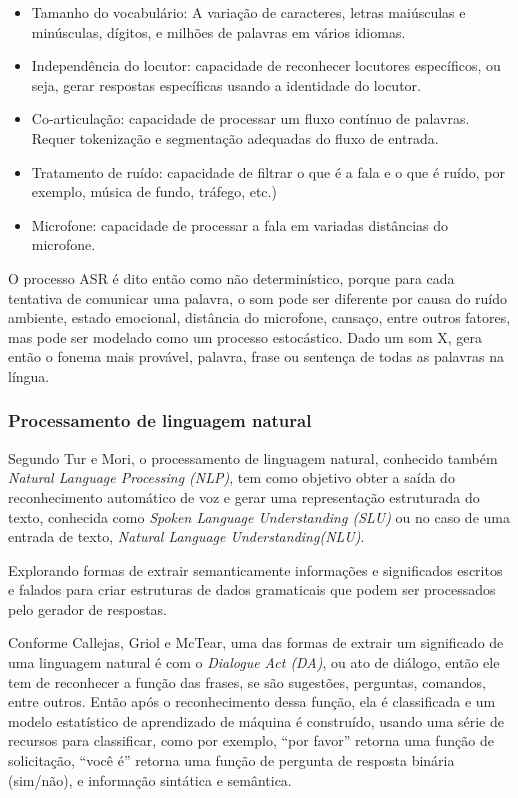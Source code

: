 \documentclass[
	12pt,				%
	oneside,
	a4paper,			%
	english,			%
	french,				%
	spanish,			%
	brazil				%
	]{abntex2}
\begin{document}
\begin{itemize}
	\item Tamanho do vocabulário: A variação de caracteres, letras maiúsculas e minúsculas, dígitos, e milhões de palavras em vários idiomas.
	\item Independência do locutor: capacidade de reconhecer locutores específicos, ou seja, gerar respostas específicas usando a identidade do locutor.
	\item Co-articulação: capacidade de processar um fluxo contínuo de palavras. Requer tokenização e segmentação adequadas do fluxo de entrada.
	\item Tratamento de ruído: capacidade de filtrar o que é a fala e o que é ruído, por exemplo, música de fundo, tráfego, etc.)
	\item Microfone: capacidade de processar a fala em variadas distâncias do microfone.
\end{itemize}

O processo ASR é dito então como não determinístico, porque para cada tentativa de comunicar uma palavra, o som pode ser diferente por causa do ruído ambiente, estado emocional, distância do microfone, cansaço, entre outros fatores, mas pode ser modelado como um processo estocástico. Dado um som X, gera então o fonema mais provável, palavra, frase ou sentença de todas as palavras na língua.

\subsubsection{Processamento de linguagem natural}
Segundo Tur e Mori\supercite{spoken-language-understan.}, o processamento de linguagem natural, conhecido também \emph{Natural Language Processing (NLP)}, tem como objetivo obter a saída do reconhecimento automático de voz e gerar uma representação estruturada do texto, conhecida como \emph{Spoken Language Understanding (SLU)} ou no caso de uma entrada de texto, \emph{Natural Language Understanding(NLU)}.

Explorando formas de extrair semanticamente informações e significados escritos e falados para criar estruturas de dados gramaticais que podem ser processados pelo gerador de respostas.

Conforme Callejas, Griol e McTear\supercite{conversational-interface}, uma das formas de extrair um significado de uma linguagem natural é com o \emph{Dialogue Act (DA)}, ou ato de diálogo, então ele tem de reconhecer a função das frases, se são sugestões, perguntas, comandos, entre outros. Então após o reconhecimento dessa função, ela é classificada e um modelo estatístico de aprendizado de máquina é construído, usando uma série de recursos para classificar, como por exemplo, “por favor” retorna uma função de solicitação, “você é” retorna uma função de pergunta de resposta binária (sim/não), e informação sintática e semântica.
\end{document}
